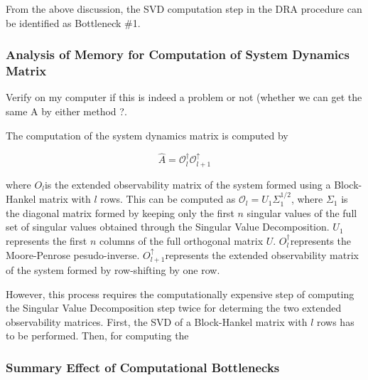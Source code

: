 From the above discussion, the SVD computation  step in the DRA procedure can be
identified as Bottleneck \#1.

\subsubsection*{Analysis of Memory for Computation of System Dynamics Matrix}

Verify on my computer if this is indeed a problem or not (whether we can get the
same A by either method ?.

The computation of the system dynamics matrix is computed by

\[
\hat{A}=\mathcal{O}_{l}^{\dagger}\mathcal{O}_{l+1}^{\uparrow}
\]

where  $O_{l}$is  the  extended  observability   matrix  of  the  system  formed
using  a   Block-Hankel  matrix  with  $l$   rows.  This  can  be   computed  as
$\mathcal{O}_{l}=U_{1}\Sigma_{1}^{1/2}$,  where  $\Sigma_{1}$  is  the  diagonal
matrix  formed   by  keeping  only  the   first  $n$  singular  values   of  the
full   set   of   singular   values  obtained   through   the   Singular   Value
Decomposition. $U_{1}$represents  the first $n$  columns of the  full orthogonal
matrix  $U$.   $O_{l}^{\dagger}$represents  the   Moore-Penrose  pesudo-inverse.
$O_{l+1}^{\uparrow}$represents the  extended observability matrix of  the system
formed by row-shifting by one row.

However, this process  requires the computationally expensive  step of computing
the  Singular Value  Decomposition step  twice  for determing  the two  extended
observability matrices.  First, the SVD of  a Block-Hankel matrix with  $l$ rows
has to be performed. Then, for computing the

\subsubsection{Summary Effect of Computational Bottlenecks}

